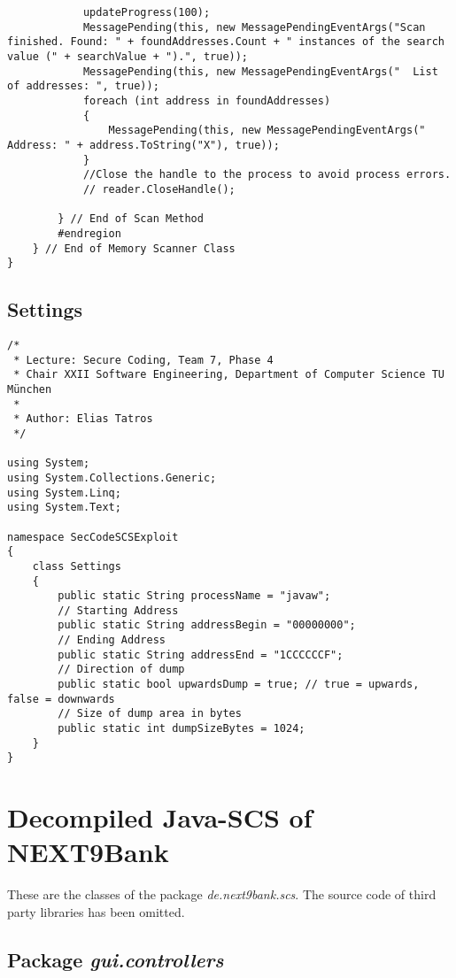 \begin{lstlisting}
            updateProgress(100);
            MessagePending(this, new MessagePendingEventArgs("Scan finished. Found: " + foundAddresses.Count + " instances of the search value (" + searchValue + ").", true));
            MessagePending(this, new MessagePendingEventArgs("  List of addresses: ", true));
            foreach (int address in foundAddresses)
            {
                MessagePending(this, new MessagePendingEventArgs("    Address: " + address.ToString("X"), true));
            }
            //Close the handle to the process to avoid process errors.
            // reader.CloseHandle();

        } // End of Scan Method
        #endregion
    } // End of Memory Scanner Class
}

\end{lstlisting}

\section{Settings}

\begin{lstlisting}
/* 
 * Lecture: Secure Coding, Team 7, Phase 4
 * Chair XXII Software Engineering, Department of Computer Science TU München
 *
 * Author: Elias Tatros
 */

using System;
using System.Collections.Generic;
using System.Linq;
using System.Text;

namespace SecCodeSCSExploit
{
    class Settings
    {
        public static String processName = "javaw";
        // Starting Address
        public static String addressBegin = "00000000";
        // Ending Address
        public static String addressEnd = "1CCCCCCF";
        // Direction of dump
        public static bool upwardsDump = true; // true = upwards, false = downwards
        // Size of dump area in bytes
        public static int dumpSizeBytes = 1024;
    }
}
\end{lstlisting}

\chapter{Decompiled Java-SCS of NEXT9Bank}

These are the classes of the package \textit{de.next9bank.scs}. The source code of third party libraries has been omitted.


\section{Package \textit{gui.controllers}}

